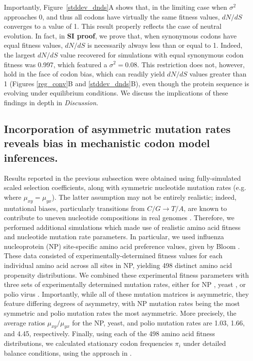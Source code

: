 \documentclass{pnastwo}
\begin{document}
\begin{article}
Importantly, Figure~\ref{stddev_dnds}A shows that, in the limiting case when $\sigma^2$ approaches 0, and thus all codons have virtually the same fitness values, $dN/dS$ converges to a value of 1. This result properly reflects the case of neutral evolution. In fact, in \textbf{SI proof}, we prove that, when synonymous codons have equal fitness values, $dN/dS$ is necessarily always less than or equal to 1. Indeed, the largest $dN/dS$ value recovered for simulations with equal synonymous codon fitness was 0.997, which featured a $\sigma^2 = 0.08$. This restriction does not, however, hold in the face of codon bias, which can readily yield $dN/dS$ values greater than 1 (Figures \ref{reg_conv}B and \ref{stddev_dnds}B), even though the protein sequence is evolving under equilibrium conditions. We discuss the implications of these findings in depth in \textit{Discussion}.


\subsection*{Incorporation of asymmetric mutation rates reveals bias in mechanistic codon model inferences.}

Results reported in the previous subsection were obtained using fully-simulated scaled selection coefficients, along with symmetric nucleotide mutation rates (e.g. where $\mu_{xy} = \mu_{yx}$). The latter assumption may not be entirely realistic; indeed, mutational biases, particularly transitions from $C/G \rightarrow T/A$, are known to contribute to uneven nucleotide compositions in real genomes \cite{Hernandez2007,HershbergPetrov2010,Zhu2014,Acevedo2014}. Therefore, we performed additional simulations which made use of realistic amino acid fitness and nucleotide mutation rate parameters. In particular, we used influenza nucleoprotein (NP) site-specific amino acid preference values, given by Bloom \cite{Bloom2014a}. These data consisted of experimentally-determined fitness values for each individual amino acid across all sites in NP, yielding 498 distinct amino acid propensity distributions. We combined these experimental fitness parameters with three sets of experimentally determined mutation rates, either for NP \cite{Bloom2014a}, yeast \cite{Zhu2014}, or polio virus \cite{Acevedo2014}. Importantly, while all of these mutation matrices is asymmetric, they feature differing degrees of asymmetry, with NP mutation rates being the most symmetric and polio mutation rates the most asymmetric. More precisely, the average ratios $\mu_{xy}/\mu_{yx}$ for the NP, yeast, and polio mutation rates are 1.03, 1.66, and 4.45, respectively. Finally, using each of the 498 amino acid fitness distributions, we calculated stationary codon frequencies $\pi_i$ under detailed balance conditions, using the approach in \cite{Bloom2014a,Bloom2014b}. 


\end{article}
\end{document}
